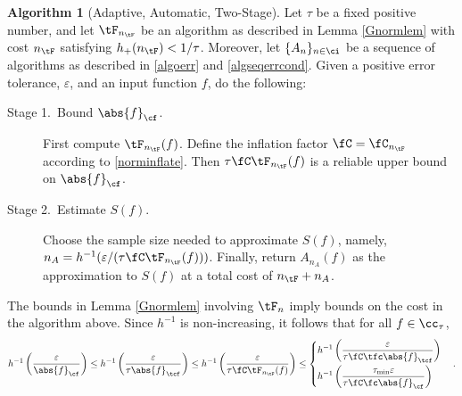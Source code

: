 \documentclass[]{elsarticle}
\theoremstyle{definition}
\newtheorem{algo}{Algorithm}
\theoremstyle{remark}
\newcommand{\Fnorm}[1]{\abs{#1}_{\cf}}
\newcommand{\Ftnorm}[1]{\abs{#1}_{\tcf}}
\begin{document}
\begin{algo}[Adaptive, Automatic, Two-Stage] \label{twostagedetalgo} Let $\tau$ be a fixed positive number, and let $\tF_{n_{\tF}}$ be an algorithm as described in Lemma \ref{Gnormlem} with cost $n_{\tF}$ satisfying $h_{+}(n_{\tF}) < 1/\tau$.
Moreover, let  $\{A_n\}_{n \in \ci}$ be a sequence of algorithms as described in \eqref{algoerr} and \eqref{algseqerrcond}.  Given  a positive error tolerance, $\varepsilon$, and  an input function $f$, do the following:

\begin{description} 

\item[Stage 1.\ Bound {$\Fnorm{f}$}.] First compute $\tF_{n_{\tF}}(f)$.  Define the inflation factor $\fC=\fC_{n_{\tF}}$ according to \eqref{norminflate}.
Then $\tau \fC \tF_{n_{\tF}}(f)$ is a reliable upper bound on $\Fnorm{f}$.  

\item [Stage 2.\ Estimate {$S(f)$}.] Choose the sample size needed to approximate $S(f)$, namely, $n_A=h^{-1}(\varepsilon/(\tau\fC \tF_{n_{\tF}}(f)))$.  Finally, return $A_{n_A}(f)$ as the approximation to $S(f)$ at a total cost of $n_{\tF}+n_A$. 
\end{description}
\end{algo}

The bounds in Lemma \ref{Gnormlem} involving $\tF_n$ imply bounds on the cost in the algorithm above.  Since $h^{-1}$ is non-increasing, it follows that for all $f \in \cc_{\tau}$,
\begin{equation*}
h^{-1}\left(\frac{\varepsilon}{\Fnorm{f}}\right) \le  h^{-1}\left(\frac{\varepsilon}{\tau\Ftnorm{f}}\right)  \le h^{-1}\left(\frac{\varepsilon}{\tau \fC \tF_{n_{\tF}}(f)}\right) \le 
\begin{cases} \displaystyle  h^{-1}\left(\frac{\varepsilon}{\tau \fC \tfc \Ftnorm{f}}\right) \\[2ex]
\displaystyle  h^{-1}\left(\frac{\tau_{\min} \varepsilon}{\tau \fC \fc \Fnorm{f}}\right)\end{cases}.
\end{equation*}
\end{document}
